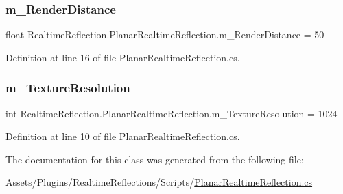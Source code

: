 \subsubsection{\texorpdfstring{m\+\_\+\+Render\+Distance}{m\_RenderDistance}}
{\footnotesize\ttfamily float Realtime\+Reflection.\+Planar\+Realtime\+Reflection.\+m\+\_\+\+Render\+Distance = 50}



Definition at line 16 of file Planar\+Realtime\+Reflection.\+cs.

\mbox{\label{class_realtime_reflection_1_1_planar_realtime_reflection_af882d1b875397946ba133aa67b576ea0}} 
\subsubsection{\texorpdfstring{m\+\_\+\+Texture\+Resolution}{m\_TextureResolution}}
{\footnotesize\ttfamily int Realtime\+Reflection.\+Planar\+Realtime\+Reflection.\+m\+\_\+\+Texture\+Resolution = 1024}



Definition at line 10 of file Planar\+Realtime\+Reflection.\+cs.



The documentation for this class was generated from the following file\+:\begin{DoxyCompactItemize}
\item 
Assets/\+Plugins/\+Realtime\+Reflections/\+Scripts/\mbox{\hyperlink{_planar_realtime_reflection_8cs}{Planar\+Realtime\+Reflection.\+cs}}\end{DoxyCompactItemize}
